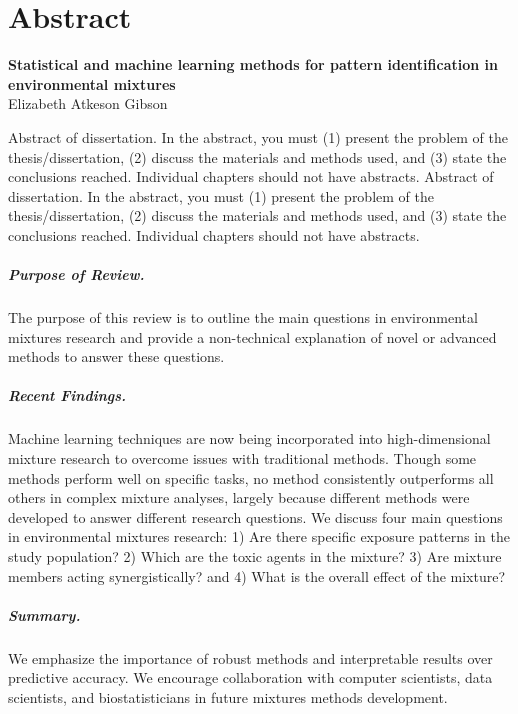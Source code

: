 \chapter*{Abstract}
\vspace{-2.5em}
\begin{center}
    \large \textbf{Statistical and machine learning methods for pattern identification in environmental mixtures} \\
    Elizabeth Atkeson Gibson \\
\end{center}
\thispagestyle{empty}

Abstract of dissertation. In the abstract, you must (1) present the problem of the thesis/dissertation, (2) discuss the materials and methods used, and (3) state the conclusions reached. Individual chapters should not have abstracts.	Abstract of dissertation. In the abstract, you must (1) present the problem of the thesis/dissertation, (2) discuss the materials and methods used, and (3) state the conclusions reached. Individual chapters should not have abstracts.
	
\paragraph{Purpose of Review.}

The purpose of this review is to outline the main questions in environmental mixtures research and provide a non-technical explanation of novel or advanced methods to answer these questions.

\paragraph{Recent Findings.} 

Machine learning techniques are now being incorporated into high-dimensional mixture research to overcome issues with traditional methods. Though some methods perform well on specific tasks, no method consistently outperforms all others in complex mixture analyses, largely because different methods were developed to answer different research questions. We discuss four main questions in environmental mixtures research: 1) Are there specific exposure patterns in the study population? 2) Which are the toxic agents in the mixture? 3) Are mixture members acting synergistically? and 4) What is the overall effect of the mixture? 

\paragraph{Summary.} 

We emphasize the importance of robust methods and interpretable results over predictive accuracy. We encourage collaboration with computer scientists, data scientists, and biostatisticians in future mixtures methods development.

\thispagestyle{empty} 
\clearpage
